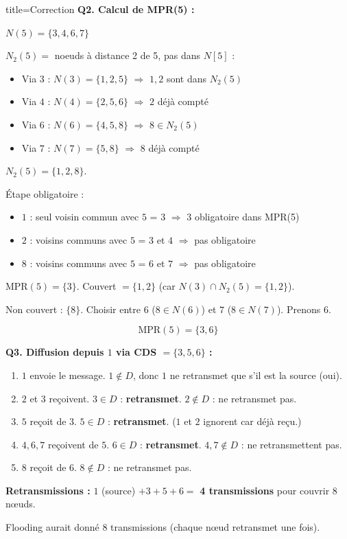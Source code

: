 \documentclass[12pt,a4paper]{article}
\begin{document}
\begin{correction}{title=Correction}
\medskip
\textbf{Q2. Calcul de MPR(5) :}

$N(5) = \{3, 4, 6, 7\}$

$N_2(5) = $ noeuds \`a distance 2 de 5, pas dans $N[5]$ :
\begin{itemize}[nosep]
    \item Via $3$ : $N(3) = \{1, 2, 5\}$ $\Rightarrow$ $1, 2$ sont dans $N_2(5)$
    \item Via $4$ : $N(4) = \{2, 5, 6\}$ $\Rightarrow$ $2$ d\'ej\`a compt\'e
    \item Via $6$ : $N(6) = \{4, 5, 8\}$ $\Rightarrow$ $8 \in N_2(5)$
    \item Via $7$ : $N(7) = \{5, 8\}$ $\Rightarrow$ $8$ d\'ej\`a compt\'e
\end{itemize}

$N_2(5) = \{1, 2, 8\}$.

\'Etape obligatoire :
\begin{itemize}[nosep]
    \item $1$ : seul voisin commun avec $5$ = $3$ $\Rightarrow$ $3$ obligatoire dans MPR(5)
    \item $2$ : voisins communs avec $5$ = $3$ et $4$ $\Rightarrow$ pas obligatoire
    \item $8$ : voisins communs avec $5$ = $6$ et $7$ $\Rightarrow$ pas obligatoire
\end{itemize}

$\text{MPR}(5) = \{3\}$. Couvert $= \{1, 2\}$ (car $N(3) \cap N_2(5) = \{1, 2\}$).

Non couvert : $\{8\}$. Choisir entre $6$ ($8 \in N(6)$) et $7$ ($8 \in N(7)$). Prenons $6$.

$$\boxed{\text{MPR}(5) = \{3, 6\}}$$

\medskip
\textbf{Q3. Diffusion depuis $1$ via CDS $= \{3, 5, 6\}$ :}

\begin{enumerate}[nosep]
    \item $1$ envoie le message. $1 \notin D$, donc $1$ ne retransmet que s'il est la source (oui).
    \item $2$ et $3$ re\c{c}oivent. $3 \in D$ : \textbf{retransmet}. $2 \notin D$ : ne retransmet pas.
    \item $5$ re\c{c}oit de $3$. $5 \in D$ : \textbf{retransmet}. ($1$ et $2$ ignorent car d\'ej\`a re\c{c}u.)
    \item $4, 6, 7$ re\c{c}oivent de $5$. $6 \in D$ : \textbf{retransmet}. $4, 7 \notin D$ : ne retransmettent pas.
    \item $8$ re\c{c}oit de $6$. $8 \notin D$ : ne retransmet pas.
\end{enumerate}

\textbf{Retransmissions :} $1$ (source) $+ 3 + 5 + 6 = $ \textbf{4 transmissions} pour couvrir 8 n\oe uds.

Flooding aurait donn\'e $8$ transmissions (chaque n\oe ud retransmet une fois).
\end{correction}
\end{document}
